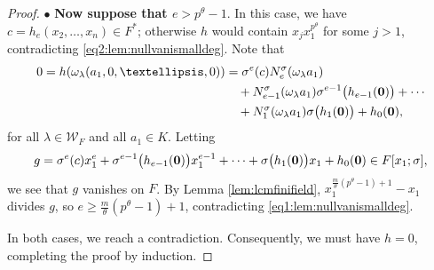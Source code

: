 \documentclass[10pt,a4paper]{amsart}
\begin{document}
\begin{proof}
\vskip 1mm
\noindent
$\bullet$ {\bf Now suppose that $e>p^\theta-1$}. In this case, we have $c=h_e(x_2,\dots,x_n) \in F^*$; otherwise $h$ would contain $x_jx_1^{p^\theta}$ for some $j>1$, contradicting \eqref{eq2:lem:nullvanismalldeg}. Note that
\begin{align*}
0=h(\omega_\lambda(a_1,0,\dots,0))
&=\sigma^e(c){\rm N}^\sigma_e(\omega_\lambda a_1)\\
&\quad+{\rm N}^\sigma_{e-1}(\omega_\lambda a_1)
  \sigma^{e-1}\big(h_{e-1}({\bf 0})\big)+\cdots\\
&\quad+{\rm N}^\sigma_1(\omega_\lambda a_1)
  \sigma\big(h_1({\bf 0})\big)+h_0({\bf 0}),
\end{align*} for all $\lambda \in \mathscr{W}_{F}$ and all $a_1 \in K$. Letting 
$$g=\sigma^e(c)x_1^e+\sigma^{e-1}\big(h_{e-1}({\bf 0})\big)x_1^{e-1}+\cdots+\sigma\big(h_1({\bf 0})\big)x_1+h_0({\bf 0}) \in F[x_1;\sigma],$$ we see that $g$ vanishes on $F$. By Lemma \ref{lem:lcmfinifield}, $x_1^{\frac{m}{\theta}(p^\theta-1)+1}-x_1$ divides $g$, so $e \geq \frac{m}{\theta}(p^\theta-1)+1$, contradicting \eqref{eq1:lem:nullvanismalldeg}.

In both cases, we reach a contradiction. Consequently, we must have $h=0$, completing the proof by induction.
\end{proof}
\end{document}
